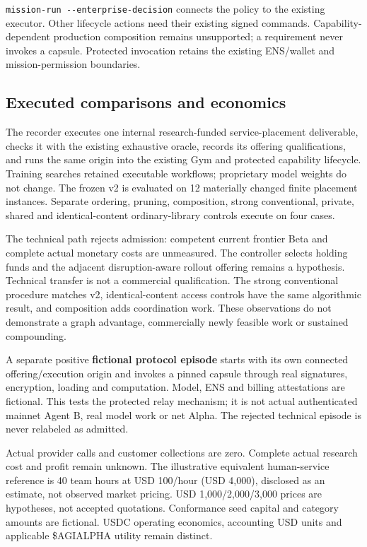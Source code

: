 \documentclass[
  10pt,
]{article}
\begin{document}
\texttt{mission-run\ -\/-enterprise-decision} connects the policy to the
existing executor. Other lifecycle actions need their existing signed
commands. Capability-dependent production composition remains
unsupported; a requirement never invokes a capsule. Protected invocation
retains the existing ENS/wallet and mission-permission boundaries.

\hypertarget{executed-comparisons-and-economics}{%
\subsection{Executed comparisons and
economics}\label{executed-comparisons-and-economics}}

The recorder executes one internal research-funded service-placement
deliverable, checks it with the existing exhaustive oracle, records its
offering qualifications, and runs the same origin into the existing Gym
and protected capability lifecycle. Training searches retained
executable workflows; proprietary model weights do not change. The
frozen v2 is evaluated on 12 materially changed finite placement
instances. Separate ordering, pruning, composition, strong conventional,
private, shared and identical-content ordinary-library controls execute
on four cases.

The technical path rejects admission: competent current frontier Beta
and complete actual monetary costs are unmeasured. The controller
selects holding funds and the adjacent disruption-aware rollout offering
remains a hypothesis. Technical transfer is not a commercial
qualification. The strong conventional procedure matches v2,
identical-content access controls have the same algorithmic result, and
composition adds coordination work. These observations do not
demonstrate a graph advantage, commercially newly feasible work or
sustained compounding.

A separate positive \textbf{fictional protocol episode} starts with its
own connected offering/execution origin and invokes a pinned capsule
through real signatures, encryption, loading and computation. Model, ENS
and billing attestations are fictional. This tests the protected relay
mechanism; it is not actual authenticated mainnet Agent B, real model
work or net Alpha. The rejected technical episode is never relabeled as
admitted.

Actual provider calls and customer collections are zero. Complete actual
research cost and profit remain unknown. The illustrative equivalent
human-service reference is 40 team hours at USD 100/hour (USD 4,000),
disclosed as an estimate, not observed market pricing. USD
1,000/2,000/3,000 prices are hypotheses, not accepted quotations.
Conformance seed capital and category amounts are fictional. USDC
operating economics, accounting USD units and applicable \$AGIALPHA
utility remain distinct.
\end{document}
